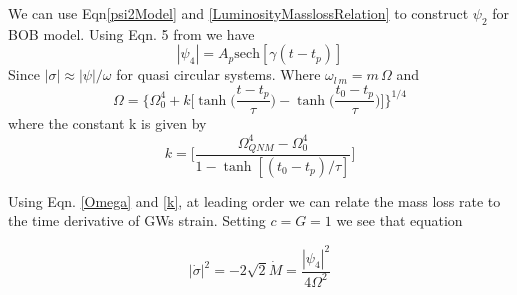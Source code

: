 \documentclass[prd,preprintnumbers,onecolumn,eqsecnum,floatfix,letter]{revtex4}
\begin{document}
We can use Eqn\;\ref{psi2Model} and \ref{LuminosityMasslossRelation} to construct $\psi_{2}$ for BOB model. Using Eqn. 5 from \cite{McWilliams_2019} we have  
\begin{equation}
	|\psi_4| = A_{p}\text{sech}[\gamma(t-t_p)]
\end{equation}
Since $|\sigma|\approx |\psi|/\omega$ for quasi circular systems. Where $\omega_{l\,m} = m\,\Omega$ and
\begin{equation}
	\Omega = \Biggl\{\Omega^{4}_{0} + k\Big[\tanh\Big(\frac{t-t_p}{\tau}\Big) -\tanh\Big(\frac{t_0-t_p}{\tau}\Big)\Big]\Biggr\}^{1/4}
	\label{Omega}
\end{equation}
where the constant k is given by
\begin{equation}
	k = \Bigg[\frac{\Omega^{4}_{QNM} - \Omega^4_{0}}{1-\tanh[(t_0-t_p)/\tau]}\Bigg]
	\label{k}
\end{equation}

Using Eqn. \ref{Omega} and \ref{k}, at leading order we can relate the mass loss rate to the time derivative of GWs strain. Setting $c = G = 1$ we see that equation 

\begin{equation}
	|\dot{\sigma}|^2 = -2\sqrt{2}\dot{M} = \frac{|\psi_4|^2}{4\Omega^2}
\end{equation}
\end{document}
